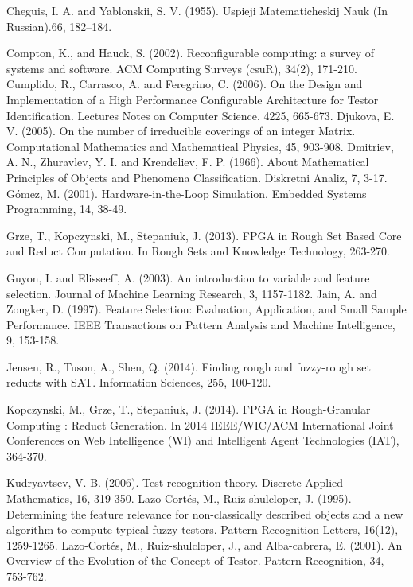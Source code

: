\documentclass[authoryear,preprint,review,12pt]{elsarticle}
\begin{document}
\begin{thebibliography}{00}

Cheguis, I. A. and Yablonskii, S. V. (1955). Uspieji Matematicheskij Nauk (In Russian).66, 182--184.

Compton, K., and Hauck, S. (2002). Reconfigurable computing: a survey of systems and software. ACM Computing Surveys (csuR), 34(2), 171-210.
 Cumplido, R., Carrasco, A. and Feregrino, C. (2006). On the Design and Implementation of a High Performance Configurable Architecture for Testor Identification. Lectures Notes on Computer Science, 4225, 665-673.
Djukova, E. V. (2005). On the number of irreducible coverings of an integer Matrix. Computational Mathematics and Mathematical Physics, 45, 903-908.
 Dmitriev, A. N.,  Zhuravlev, Y. I. and Krendeliev, F. P. (1966). About Mathematical Principles of Objects and Phenomena Classification. Diskretni Analiz, 7, 3-17.
G\'omez, M. (2001). Hardware-in-the-Loop Simulation. Embedded Systems Programming, 14, 38-49.

Grze, T., Kopczynski, M., Stepaniuk, J. (2013). FPGA in Rough Set Based Core and Reduct Computation. In Rough Sets and Knowledge Technology, 263-270.

Guyon, I. and Elisseeff, A. (2003). An introduction to variable and feature selection. Journal of Machine Learning Research, 3, 1157-1182.
Jain, A. and Zongker, D. (1997). Feature Selection: Evaluation, Application, and Small Sample Performance. IEEE Transactions on Pattern Analysis and Machine Intelligence, 9, 153-158.

Jensen, R., Tuson, A., Shen, Q. (2014). Finding rough and fuzzy-rough set reducts with SAT. Information Sciences, 255, 100-120.

Kopczynski, M., Grze, T., Stepaniuk, J. (2014). FPGA in Rough-Granular Computing : Reduct Generation. In 2014 IEEE/WIC/ACM International Joint Conferences on Web Intelligence (WI) and Intelligent Agent Technologies (IAT), 364-370. 

Kudryavtsev, V. B. (2006). Test recognition theory. Discrete Applied Mathematics, 16, 319-350.
Lazo-Cort\'es, M., Ruiz-shulcloper, J. (1995). Determining the feature relevance for non-classically described objects and a new algorithm to compute typical fuzzy testors. Pattern Recognition Letters, 16(12), 1259-1265.
Lazo-Cort\'es, M., Ruiz-shulcloper, J., and Alba-cabrera, E. (2001). An Overview of the Evolution of the Concept of Testor. Pattern Recognition, 34, 753-762.


\end{thebibliography}
\end{document}
